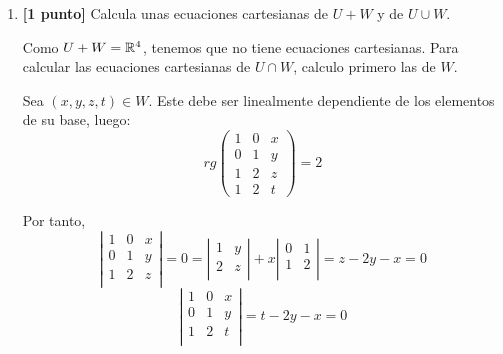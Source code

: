 \documentclass[12pt]{article}
\begin{document}
\begin{ejercicio}
\begin{enumerate}
        \item \textbf{[1 punto]} Calcula unas ecuaciones cartesianas de $U+W$ y de $U\cup W$.

        Como $U+W=\mathbb{R}^4$, tenemos que no tiene ecuaciones cartesianas. Para calcular las ecuaciones cartesianas de $U\cap W$, calculo primero las de $W$.

        Sea $(x,y,z,t)\in W$. Este debe ser linealmente dependiente de los elementos de su base, luego:
        \begin{equation*}
            rg\left(\begin{array}{ccc}
                1 & 0 & x\\
                0 & 1 & y\\
                1 & 2 & z\\
                1 & 2 & t
            \end{array}\right) = 2
        \end{equation*}

        Por tanto,
        \begin{equation*}
            \left|\begin{array}{ccc}
                1 & 0 & x\\
                0 & 1 & y\\
                1 & 2 & z\\
            \end{array}\right| = 0 = \left|\begin{array}{cc}
                1 & y\\
                2 & z\\
            \end{array}\right| + x\left|\begin{array}{cc}
                0 & 1\\
                1 & 2\\
            \end{array}\right| = z-2y-x=0
        \end{equation*}
        \begin{equation*}
            \left|\begin{array}{ccc}
                1 & 0 & x\\
                0 & 1 & y\\
                1 & 2 & t\\
            \end{array}\right| = t-2y-x=0
        \end{equation*}


\end{enumerate}
\end{ejercicio}
\end{document}
